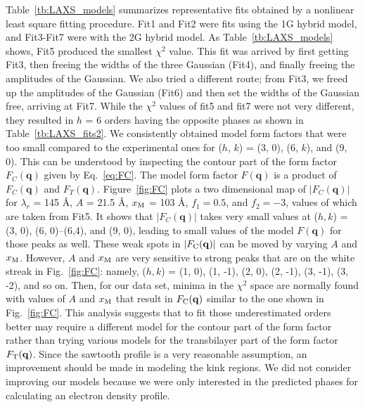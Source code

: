 Table~\ref{tb:LAXS_models} summarizes representative fits obtained by a nonlinear
least square fitting procedure. Fit1 and Fit2 were fits using the 1G hybrid model,
and Fit3-Fit7 were with the 2G hybrid model. As Table~\ref{tb:LAXS_models} shows, 
Fit5 produced the smallest $\chi^2$ value. This fit was arrived by first getting 
Fit3, then freeing the widths of the three Gaussian (Fit4), 
and finally freeing the amplitudes of the Gaussian.
We also tried a different route; from Fit3, we freed up the amplitudes of 
the Gaussian (Fit6) and then set the widths of the Gaussian free, arriving 
at Fit7. While the $\chi^2$ values of fit5 and fit7 were not very different,
they resulted in $h$ = 6 orders having the opposite phases as shown in 
Table~\ref{tb:LAXS_fits2}. We consistently obtained model
form factors that were too small compared to the experimental ones 
for ($h$, $k$) = (3, 0), (6, $k$), and (9, 0). This can be understood by
inspecting the contour part of the form factor $F_C(\mathbf{q})$ 
given by Eq.~\ref{eq:FC}.
The model form factor $F(\mathbf{q})$ is a product of
$F_C(\mathbf{q})$ and $F_T(\mathbf{q})$.
Figure~\ref{fig:FC} plots a two dimensional map of $|F_C(\mathbf{q})|$ for
$\lambda_r$ = 145 \AA, $A$ = 21.5 \AA, $x_\textrm{M}$ = 103 \AA, $f_1=0.5$,
and $f_2=-3$, values of which are taken from Fit5.
It shows that $|F_C(\mathbf{q})|$ takes very small values at 
($h, k$) = (3, 0), (6, 0)--(6,4), and (9, 0), leading to small values of
the model $F(\mathbf{q})$ for those peaks as well. These weak spots in $|F_\mathrm{C}(\mathbf{q})|$
can be moved by varying $A$ and $x_\textrm{M}$. However, $A$ and $x_\textrm{M}$ are very 
sensitive to strong peaks that are on the white streak in Fig.~\ref{fig:FC}:
namely, ($h, k$) = (1, 0), (1, -1), (2, 0), (2, -1), (3, -1), (3, -2), and so on.
Then, for our data set, minima in the $\chi^2$ space are normally found
with values of $A$ and $x_\textrm{M}$ that result in $F_\mathrm{C}(\mathbf{q})$ similar to the 
one shown in Fig.~\ref{fig:FC}.
This analysis
suggests that to fit those underestimated orders better may require a different model
for the contour part of the form factor rather than trying various
models for the transbilayer part of the form factor $F_\mathrm{T}(\mathbf{q})$. 
Since the sawtooth profile is a very reasonable assumption, an improvement
should be made in modeling the kink regions.
We did not consider
improving our models because we were only interested in the predicted
phases for calculating an electron density profile.

